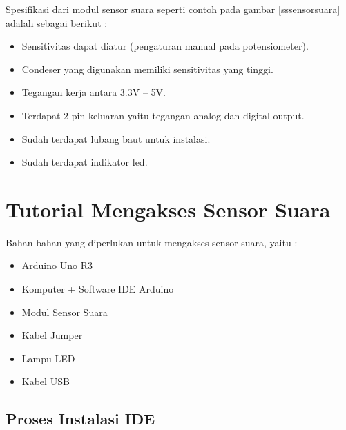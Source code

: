 Spesifikasi dari modul sensor suara seperti contoh pada gambar \ref{sssensorsuara} adalah sebagai berikut :

\begin{itemize}
\item Sensitivitas dapat diatur (pengaturan manual pada potensiometer).
\item Condeser yang digunakan memiliki sensitivitas yang tinggi.
\item Tegangan kerja antara 3.3V – 5V.
\item Terdapat 2 pin keluaran yaitu tegangan analog dan digital output.
\item Sudah terdapat lubang baut untuk instalasi.
\item Sudah terdapat indikator led.
\end{itemize}

\section{Tutorial Mengakses Sensor Suara}

\hspace{4mm} Bahan-bahan yang diperlukan untuk mengakses sensor suara, yaitu :

\begin{itemize}
\item Arduino Uno R3
\item Komputer + Software IDE Arduino
\item Modul Sensor Suara
\item Kabel Jumper
\item Lampu LED
\item Kabel USB
\end{itemize}

\subsection{Proses Instalasi IDE}

